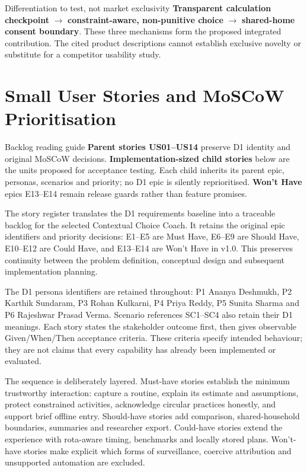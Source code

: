 \documentclass[12pt,a4paper]{article}
\begin{document}
\begin{insightbox}{Differentiation to test, not market exclusivity}
\textbf{Transparent calculation checkpoint} $\rightarrow$ \textbf{constraint-aware, non-punitive choice} $\rightarrow$ \textbf{shared-home consent boundary}. These three mechanisms form the proposed integrated contribution. The cited product descriptions cannot establish exclusive novelty or substitute for a competitor usability study.
\end{insightbox}

\clearpage
\clearpage
\section{Small User Stories and MoSCoW Prioritisation}

\begin{chapterfocus}{Backlog reading guide}
\textbf{Parent stories US01--US14} preserve D1 identity and original MoSCoW decisions. \textbf{Implementation-sized child stories} below are the units proposed for acceptance testing. Each child inherits its parent epic, personas, scenarios and priority; no D1 epic is silently reprioritised. \textbf{Won't Have} epics E13--E14 remain release guards rather than feature promises.
\end{chapterfocus}


The story register translates the D1 requirements baseline into a traceable backlog for the selected Contextual Choice Coach. It retains the original epic identifiers and priority decisions: E1--E5 are Must Have, E6--E9 are Should Have, E10--E12 are Could Have, and E13--E14 are Won't Have in v1.0. This preserves continuity between the problem definition, conceptual design and subsequent implementation planning.

The D1 persona identifiers are retained throughout: P1 Ananya Deshmukh, P2 Karthik Sundaram, P3 Rohan Kulkarni, P4 Priya Reddy, P5 Sunita Sharma and P6 Rajeshwar Prasad Verma. Scenario references SC1--SC4 also retain their D1 meanings. Each story states the stakeholder outcome first, then gives observable Given/When/Then acceptance criteria. These criteria specify intended behaviour; they are not claims that every capability has already been implemented or evaluated.

The sequence is deliberately layered. Must-have stories establish the minimum trustworthy interaction: capture a routine, explain its estimate and assumptions, protect constrained activities, acknowledge circular practices honestly, and support brief offline entry. Should-have stories add comparison, shared-household boundaries, summaries and researcher export. Could-have stories extend the experience with rota-aware timing, benchmarks and locally stored plans. Won't-have stories make explicit which forms of surveillance, coercive attribution and unsupported automation are excluded.
\end{document}
